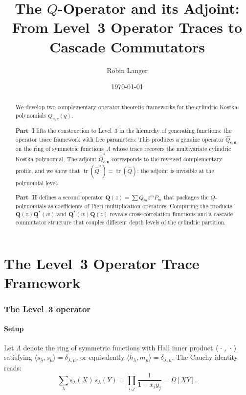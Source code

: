 \documentclass[11pt]{article}
\title{The $Q$-Operator and its Adjoint:\\
From Level~3 Operator Traces to Cascade Commutators}
\author{Robin Langer}
\date{\today}
\newcommand{\La}{\Lambda}
\DeclareMathOperator{\tr}{tr}
\theoremstyle{plain}
\theoremstyle{definition}
\begin{document}
\maketitle

\begin{abstract}
We develop two complementary operator-theoretic frameworks for the
cylindric Kostka polynomials $Q_{n,c}(q)$.

\smallskip\noindent
\textbf{Part~I} lifts the construction to Level~3 in the hierarchy
of generating functions: the operator trace framework with free
parameters.  This produces a genuine operator
$\hat{Q}_{c,\mathbf{n}}$ on the ring of symmetric functions~$\La$
whose trace recovers the multivariate cylindric Kostka polynomial.
The adjoint $\hat{Q}_{c,\mathbf{n}}^*$ corresponds to the
reversed-complementary profile, and we show that
$\tr(\hat{Q}^*) = \tr(\hat{Q})$: the adjoint is invisible at
the polynomial level.

\smallskip\noindent
\textbf{Part~II} defines a second operator $\mathbf{Q}(z)
= \sum Q_m z^m P_m$ that packages the $Q$-polynomials as
coefficients of Pieri multiplication operators.  Computing the
products $\mathbf{Q}(z)\mathbf{Q}^*(w)$ and
$\mathbf{Q}^*(w)\mathbf{Q}(z)$ reveals cross-correlation
functions and a cascade commutator structure that couples
different depth levels of the cylindric partition.
\end{abstract}

\tableofcontents



\part{The Level~3 Operator Trace Framework}


\section{The Level~3 operator}
\label{sec:level3}

\subsection{Setup}

Let $\La$ denote the ring of symmetric functions with Hall inner
product $\langle\,\cdot\,,\,\cdot\,\rangle$ satisfying
$\langle s_\lambda, s_\mu \rangle = \delta_{\lambda,\mu}$,
or equivalently $\langle h_\lambda, m_\mu \rangle
= \delta_{\lambda,\mu}$.  The Cauchy identity reads:
\begin{equation}\label{eq:cauchy}
  \sum_\lambda s_\lambda(X)\, s_\lambda(Y)
  = \prod_{i,j} \frac{1}{1 - x_i y_j}
  = \Omega[XY].
\end{equation}
\end{document}
